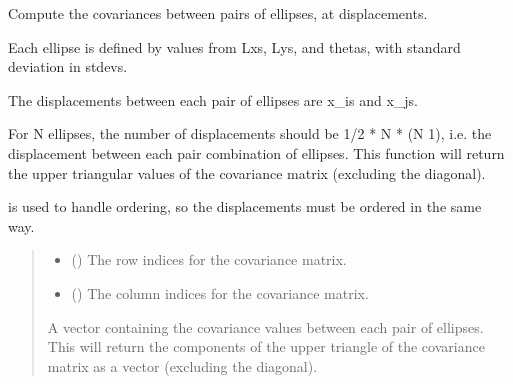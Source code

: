 \documentclass[letterpaper,10pt,english]{sphinxmanual}
\begin{document}
\begin{fulllineitems}
\begin{fulllineitems}
\label{\detokenize{ellipse:glomar_gridding.ellipse.EllipseCovarianceBuilder.c_ij_anisotropic_array}}
\pysigstartsignatures
\pysiglinewithargsret
{}
{\sphinxparamcomma {}}
{}
\pysigstopsignatures
\sphinxAtStartPar
Compute the covariances between pairs of ellipses, at displacements.

\sphinxAtStartPar
Each ellipse is defined by values from Lxs, Lys, and thetas, with
standard deviation in stdevs.

\sphinxAtStartPar
The displacements between each pair of ellipses are x\_is and x\_js.

\sphinxAtStartPar
For N ellipses, the number of displacements should be 1/2 * N * (N \sphinxhyphen{} 1),
i.e. the displacement between each pair combination of ellipses. This
function will return the upper triangular values of the covariance
matrix (excluding the diagonal).

\sphinxAtStartPar
{} is used to handle ordering, so the
displacements must be ordered in the same way.
\begin{quote}\begin{description}
\begin{itemize}
\item {}
\sphinxAtStartPar
{} () \textendash{} The row indices for the covariance matrix.

\item {}
\sphinxAtStartPar
{} () \textendash{} The column indices for the covariance matrix.

\end{itemize}

\sphinxAtStartPar
{} \textendash{} A vector containing the covariance values between each pair of
ellipses. This will return the components of the upper triangle of
the covariance matrix as a vector (excluding the diagonal).

\sphinxAtStartPar
{}

\end{description}\end{quote}

\end{fulllineitems}
\end{fulllineitems}
\end{document}
